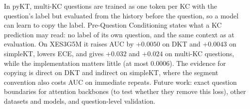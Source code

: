 In pyKT, multi-KC questions are trained as one token per KC with the question's label but evaluated from the history before the question, so a model can learn to copy the label. Pre-Question Conditioning states what a KC prediction may read: no label of its own question, and the same context as at evaluation. On XES3G5M it raises AUC by $+0.0050$ on DKT and $+0.0043$ on simpleKT, lowers ECE, and gives $+0.032$ and $+0.024$ on multi-KC questions, while the implementation matters little (at most 0.0006). The evidence for copying is direct on DKT and indirect on simpleKT, where the segment convention also costs AUC on immediate repeats. Future work: exact question boundaries for attention backbones (to test whether they remove this loss), other datasets and models, and question-level validation.